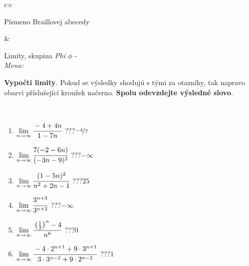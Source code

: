 \documentclass[10pt]{report}
\begin{document}
\begin{tabular}{c:c}
\begin{minipage}[c][104.5mm][t]{0.5\linewidth}
\begin{center}
\begin{minipage}{0.20\linewidth}
\begin{center}
{\small Písmeno Braillovej abecedy}
\end{center}
\end{minipage}
\end{center}
\end{minipage}
&
\begin{minipage}[c][104.5mm][t]{0.5\linewidth}
\begin{center}
\vspace{7mm}
{\huge Limity, skupina \textit{Phi $\phi$} -}\\[5mm]
\textit{Meno:}\phantom{xxxxxxxxxxxxxxxxxxxxxxxxxxxxxxxxxxxxxxxxxxxxxxxxxxxxxxxxxxxxxxxxx}\\[5mm]
\begin{minipage}{0.95\linewidth}
\begin{center}
\textbf{Vypočti limity}. Pokud se výsledky shodujú s tými za otazníky, tak napravo\\obarvi příslušející kroužek načerno. \textbf{Spolu odevzdejte výsledné slovo}.
\end{center}
\end{minipage}
\\[1mm]
\begin{minipage}{0.79\linewidth}
\begin{center}
\begin{varwidth}{\linewidth}
\begin{enumerate}
\normalsize
\item $\lim\limits_{n\to\infty}\cfrac{-4+4n}{1-7n}$\quad \dotfill\; ???\;\dotfill \quad $\nicefrac{-4}{7}$
\item $\lim\limits_{n\to\infty}\cfrac{7(-2-6n)}{(-3n-9)^2}$\quad \dotfill\; ???\;\dotfill \quad $-\infty$
\item $\lim\limits_{n\to\infty}\cfrac{(1-5n)^2}{n^2+2n-1}$\quad \dotfill\; ???\;\dotfill \quad $25$
\item $\lim\limits_{n\to\infty}\cfrac{3^{n+3}}{3^{n+2}}$\quad \dotfill\; ???\;\dotfill \quad $-\infty$
\item $\lim\limits_{n\to\infty}\cfrac{\left(\frac{1}{2}\right)^n -4}{n^{6}}$\quad \dotfill\; ???\;\dotfill \quad $0$
\item $\lim\limits_{n\to\infty}\cfrac{-4\cdot 2^{n+1}+9\cdot 3^{n+1}}{3\cdot 3^{n-2}+9\cdot 2^{n-2}}$\quad \dotfill\; ???\;\dotfill \quad $1$
\end{enumerate}
\end{varwidth}
\end{center}
\end{minipage}
\begin{minipage}{0.20\linewidth}

\end{minipage}
\end{center}
\end{minipage}
\end{tabular}
\end{document}

